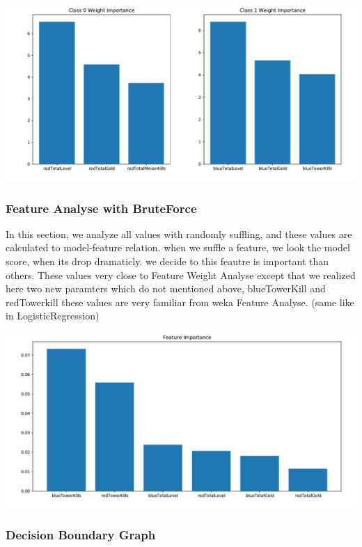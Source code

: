 \documentclass[a4paper]{article}
\begin{document}
\medskip

\includegraphics[width=.9\linewidth]{graphs/sgdclassifier_feature_importance_weights.pdf}

\pagebreak

\subsubsection{Feature Analyse with BruteForce}

In this section, we analyze all values with randomly suffling, and these values are calculated to model-feature relation. when we suffle a feature, we look the model score, when its drop dramaticly. we decide to this feautre is important than others. These values very close to Feature Weight Analyse except that we realized here two new paramters which do not mentioned above, blueTowerKill and redTowerkill these values are very familiar from weka Feature Analyse. (same like in LogisticRegression)

\medskip

\includegraphics[width=.9\linewidth]{graphs/sgdclassifier_feature_importance.pdf}

\subsubsection{Decision Boundary Graph}
\end{document}
